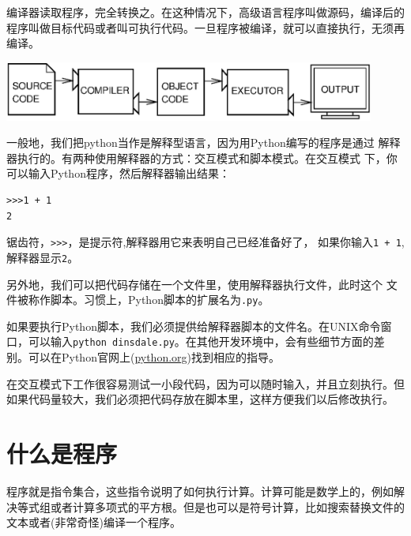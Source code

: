 
编译器读取程序，完全转换之。在这种情况下，高级语言程序叫做源码，编译后的程序叫做目标代码或者叫可执行代码。一旦程序被编译，就可以直接执行，无须再编译。

\beforefig
\centerline{\includegraphics[height=0.77in]{figs/compile.eps}}
\afterfig

一般地，我们把python当作是解释型语言，因为用Python编写的程序是通过
解释器执行的。有两种使用解释器的方式：交互模式和脚本模式。在交互模式
下，你可以输入Python程序，然后解释器输出结果：


\beforeverb
\begin{verbatim}    
>>>1 + 1
2
\end{verbatim} %
\afterverb

锯齿符，{\tt >>>}，是提示符,解释器用它来表明自己已经准备好了，
如果你输入{\tt 1 + 1},解释器显示{\tt 2}。\\


另外地，我们可以把代码存储在一个文件里，使用解释器执行文件，此时这个
文件被称作脚本。习惯上，Python脚本的扩展名为{\tt .py}。


如果要执行Python脚本，我们必须提供给解释器脚本的文件名。在UNIX命令窗口，可以输入{\tt python dinsdale.py}。在其他开发环境中，会有些细节方面的差别。可以在Python官网上(\url{python.org})找到相应的指导。


在交互模式下工作很容易测试一小段代码，因为可以随时输入，并且立刻执行。但如果代码量较大，我们必须把代码存放在脚本里，这样方便我们以后修改执行。 

\section{什么是程序}

程序就是指令集合，这些指令说明了如何执行计算。计算可能是数学上的，例如解决等式组或者计算多项式的平方根。但是也可以是符号计算，比如搜索替换文件的文本或者(非常奇怪)编译一个程序。



